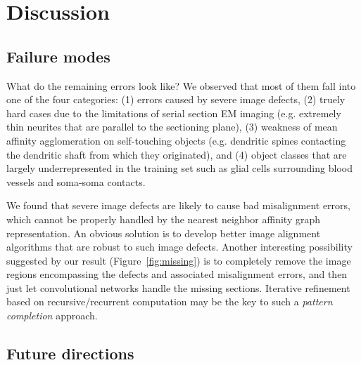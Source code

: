 \documentclass{article}
\begin{document}
\section{Discussion}
\label{discussion}

%

\subsection{Failure modes}

What do the remaining errors look like? We observed that most of them fall into
one of the four categories: (1) errors caused by severe image defects, (2)
truely hard cases due to the limitations of serial section EM imaging (e.g.
extremely thin neurites that are parallel to the sectioning plane), (3) weakness
of mean affinity agglomeration on self-touching objects (e.g. dendritic spines
contacting the dendritic shaft from which they originated), and (4) object
classes that are largely underrepresented in the training set such as glial
cells surrounding blood vessels and soma-soma contacts.

We found that severe image defects are likely to cause bad misalignment errors,
which cannot be properly handled by the nearest neighbor affinity graph
representation. An obvious solution is to develop better image alignment
algorithms that are robust to such image defects. Another interesting
possibility suggested by our result (Figure~\ref{fig:missing}) is to completely
remove the image regions encompassing the defects and associated misalignment
errors, and then just let convolutional networks handle the missing sections.
Iterative refinement based on recursive/recurrent computation may be the key to
such a \textit{pattern completion} approach.

\subsection{Future directions}
\end{document}
